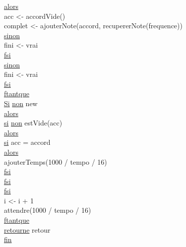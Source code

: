 \begin{tabbing}
                \>\>\>\>\>\ul{alors}\\
                    \>\>\>\>\>\>acc <- accordVide()\\
                    \>\>\>\>\>\>complet <- ajouterNote(accord, recupererNote(frequence))\\
                \>\>\>\>\>\ul{sinon}\\
                    \>\>\>\>\>\>fini <- vrai\\
                \>\>\>\>\>\ul{fsi}\\
            \>\>\>\>\ul{sinon}\\
                \>\>\>\>\>fini <- vrai\\
            \>\>\>\>\ul{fsi}\\
    \>\>\ul{ftantque}\\     
    \>\>\ul{Si} \ul{non} new\\
    \>\>\ul{alors}\\
        \>\>\>\ul{si} \ul{non} estVide(acc)\\
        \>\>\>\ul{alors}\\
            \>\>\>\>\ul{si} acc = accord\\
            \>\>\>\>\ul{alors}\\
                \>\>\>\>\>ajouterTemps(1000 / tempo / 16)\\
            \>\>\>\>\ul{fsi}\\
        \>\>\>\ul{fsi}\\
    \>\>\ul{fsi}\\
    \>\>i <- i + 1\\  
    \>\>attendre(1000 / tempo / 16)\\
\>\ul{ftantque}\\
\>\ul{retourne} retour \\
\ul{fin}\\
\end{tabbing}

